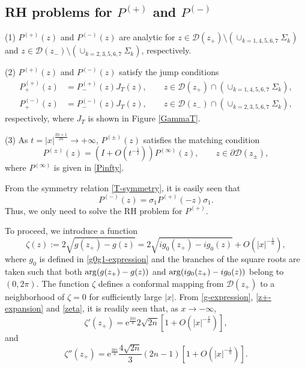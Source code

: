 \documentclass[11pt,a4paper]{article}
\numberwithin{equation}{section}
\def\arg {\mathop{\rm arg}\nolimits}
\begin{document}
\subsection*{RH problems for ${P}^{(+)}$ and ${P}^{(-)}$}
\begin{description}
\item{(1)}
${P}^{(+)}(z)$ and ${P}^{(-)}(z)$ are analytic for $z \in \mathcal{D}(z_{+}) \setminus (\cup_{k=1,4,5,6,7} \Sigma_{k})$ and $z \in \mathcal{D}(z_-) \setminus (\cup_{k=2,3,5,6,7} \Sigma_{k})$, respectively. %
\item{(2)} ${P}^{(+)}(z)$ and ${P}^{(-)}(z)$ satisfy the jump conditions
\begin{align}
{P}^{(+)}_+(z) & = {P}^{(+)}_-(z)J_T(z), \qquad z \in \mathcal{D}(z_{+}) \cap (\cup_{k=1,4,5,6,7}\Sigma_{k}),
\label{eq:P+jump}\\
{P}^{(-)}_+(z) & = {P}^{(-)}_-(z)J_T(z), \qquad z \in \mathcal{D}(z_{-}) \cap (\cup_{k=2,3,5,6,7}\Sigma_{k}),
\end{align}
respectively, where $J_{T}$ is shown in Figure \ref{GammaT}.
\item{(3)} As $t=|x|^{\frac{2n+1}{2n}}\to+\infty$,  ${P}^{(\pm)}(z)$ satisfies the  matching condition
\begin{equation}\label{matching}
{P}^{(\pm)}(z)=\left(I+O\left(t^{-\frac{1}{2}}\right)\right){P}^{(\infty)}(z), \qquad z\in \partial \mathcal{D}(z_{\pm}),
\end{equation}
where ${P}^{(\infty)}$ is given in \eqref{Pinfty}.
\end{description}

From the symmetry relation \eqref{T-symmetry}, it is easily seen that
\begin{equation}\label{P-}
{P}^{(-)}(z)=\sigma_1{P}^{(+)}(-z)\sigma_1.
\end{equation}
Thus, we only need to solve the RH problem for ${P}^{(+)}$.


To proceed, we introduce a function
\begin{equation}\label{zeta}
\zeta(z):=2\sqrt{g(z_+)-g(z)}=2\sqrt{ig_0(z_+)-ig_0(z)}+O\left(|x|^{-\frac{1}{n}}\right),
\end{equation}
where $g_0$ is defined in \eqref{g0g1-expression} and the branches of the square roots are taken such that both $\arg(g(z_+)-g(z))$ and $\arg(ig_0(z_+)-ig_0(z))$ belong to $(0,2\pi)$. The function $\zeta$ defines a conformal mapping from $\mathcal{D}(z_+)$ to a neighborhood of $\zeta=0$ for sufficiently large $|x|$. From \eqref{g-expression}, \eqref{z+-expansion} and \eqref{zeta}, it is readily seen that, as $x\to-\infty$,
\begin{equation}\label{zeta'behavior}
\zeta'(z_+)=\mathrm{e}^{\frac{3\pi i}{4}}2\sqrt{2n}\left[1+O\left(|x|^{-\frac{1}{n}}\right)\right],
\end{equation}
and
\begin{equation}\label{zeta''behavior}
\zeta''(z_+)=\mathrm{e}^{\frac{3\pi i}{4}}\frac{4\sqrt{2n}}{3}(2n-1)\left[1+O\left(|x|^{-\frac{1}{n}}\right)\right].
\end{equation}
\end{document}

